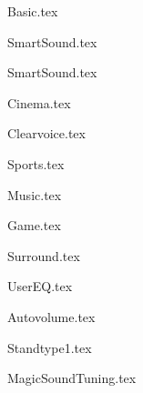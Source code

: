 {Basic.tex}

{SmartSound.tex}

{SmartSound.tex}

{Cinema.tex}

{Clearvoice.tex}

{Sports.tex}

{Music.tex}

{Game.tex}

{Surround.tex}


{UserEQ.tex}

{Autovolume.tex}

{Standtype1.tex}



{MagicSoundTuning.tex}